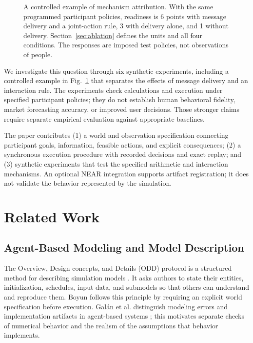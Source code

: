 \begin{figure}[t]
\centering
{}
\caption{A controlled example of mechanism attribution. With the same
programmed participant policies, readiness is 6 points with message delivery
and a joint-action rule, 3 with delivery alone, and 1 without delivery.
Section~\ref{sec:ablation} defines the units and all four conditions. The
responses are imposed test policies, not observations of people.}
\label{fig:teaser}
\end{figure}

We investigate this question through six synthetic experiments, including a
controlled example in Fig.~\ref{fig:teaser} that separates the effects of
message delivery and an interaction rule. The experiments check calculations
and execution under specified participant policies; they do not establish
human behavioral fidelity, market forecasting accuracy, or improved user
decisions. Those stronger claims require separate empirical evaluation against
appropriate baselines.

The paper contributes (1) a world and observation specification connecting
participant goals, information, feasible actions, and explicit consequences;
(2) a synchronous execution procedure with recorded decisions and exact replay;
and (3) synthetic experiments that test the specified arithmetic and
interaction mechanisms. An optional NEAR integration supports artifact
registration; it does not validate the behavior represented by the simulation.

\section{Related Work}\label{sec:related}
\subsection{Agent-Based Modeling and Model Description}
The Overview, Design concepts, and Details (ODD) protocol is a structured
method for describing simulation models \cite{grimm2020}. It asks authors to
state their entities, initialization, schedules, input data, and submodels so
that others can understand and reproduce them. Boyun follows this principle
by requiring an explicit world specification before execution. Gal\'an
et al. distinguish modeling errors and implementation artifacts in agent-based
systems \cite{galan2009}; this motivates separate checks of numerical behavior
and the realism of the assumptions that behavior implements.

